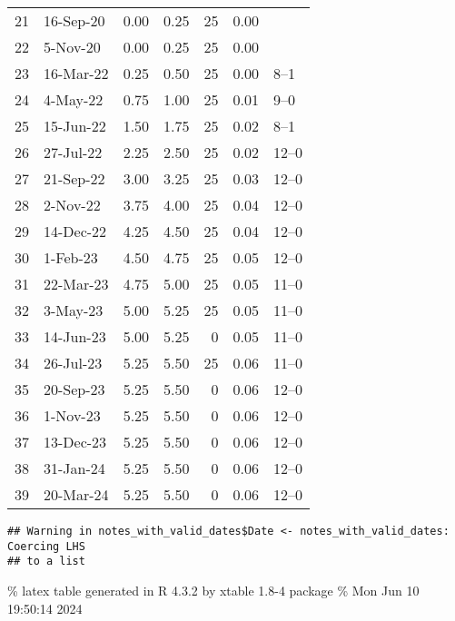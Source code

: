 \documentclass[
]{article}
\begin{document}
\begin{table}[ht]
\begin{tabular}{rlrrrrl}
  21 & 16-Sep-20 & 0.00 & 0.25 &  25 & 0.00 &   \\ 
  22 & 5-Nov-20 & 0.00 & 0.25 &  25 & 0.00 &   \\ 
  23 & 16-Mar-22 & 0.25 & 0.50 &  25 & 0.00 & 8–1 \\ 
  24 & 4-May-22 & 0.75 & 1.00 &  25 & 0.01 & 9–0 \\ 
  25 & 15-Jun-22 & 1.50 & 1.75 &  25 & 0.02 & 8–1 \\ 
  26 & 27-Jul-22 & 2.25 & 2.50 &  25 & 0.02 & 12–0 \\ 
  27 & 21-Sep-22 & 3.00 & 3.25 &  25 & 0.03 & 12–0 \\ 
  28 & 2-Nov-22 & 3.75 & 4.00 &  25 & 0.04 & 12–0 \\ 
  29 & 14-Dec-22 & 4.25 & 4.50 &  25 & 0.04 & 12–0 \\ 
  30 & 1-Feb-23 & 4.50 & 4.75 &  25 & 0.05 & 12–0 \\ 
  31 & 22-Mar-23 & 4.75 & 5.00 &  25 & 0.05 & 11–0 \\ 
  32 & 3-May-23 & 5.00 & 5.25 &  25 & 0.05 & 11–0 \\ 
  33 & 14-Jun-23 & 5.00 & 5.25 &   0 & 0.05 & 11–0 \\ 
  34 & 26-Jul-23 & 5.25 & 5.50 &  25 & 0.06 & 11–0 \\ 
  35 & 20-Sep-23 & 5.25 & 5.50 &   0 & 0.06 & 12–0 \\ 
  36 & 1-Nov-23 & 5.25 & 5.50 &   0 & 0.06 & 12–0 \\ 
  37 & 13-Dec-23 & 5.25 & 5.50 &   0 & 0.06 & 12–0 \\ 
  38 & 31-Jan-24 & 5.25 & 5.50 &   0 & 0.06 & 12–0 \\ 
  39 & 20-Mar-24 & 5.25 & 5.50 &   0 & 0.06 & 12–0 \\ 
   \hline
\end{tabular}
\end{table}

\begin{verbatim}
## Warning in notes_with_valid_dates$Date <- notes_with_valid_dates: Coercing LHS
## to a list
\end{verbatim}

\% latex table generated in R 4.3.2 by xtable 1.8-4 package
\% Mon Jun 10 19:50:14 2024
\end{document}
